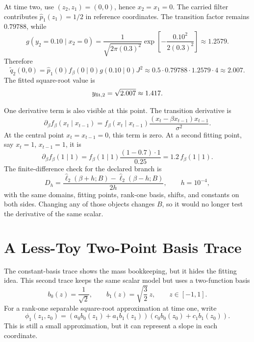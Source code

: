 \documentclass[11pt]{article}
\numberwithin{equation}{section}
\begin{document}
At time two, use \((z_2,z_1)=(0,0)\), hence \(x_2=x_1=0\).  The carried
filter contributes \(\widehat p_1(z_1)=1/2\) in reference coordinates.  The
transition factor remains \(0.79788\), while
\begin{equation}
    g(y_2=0.10\mid x_2=0)
    =
    \frac{1}{\sqrt{2\pi(0.3)^2}}
    \exp\!\left[-\frac{0.10^2}{2(0.3)^2}\right]
    \approx1.2579.
    \label{eq:p24-trace-density3}
\end{equation}
Therefore
\begin{equation}
    \widetilde q_2(0,0)
    =
    \widehat p_1(0)f_\beta(0\mid0)g(0.10\mid0)J^2
    \approx
    0.5\cdot0.79788\cdot1.2579\cdot4
    \approx2.007.
    \label{eq:p24-trace-q2}
\end{equation}
The fitted square-root value is
\begin{equation}
    y_{\rm fit,2}=\sqrt{2.007}\approx1.417.
    \label{eq:p24-trace-root2}
\end{equation}

One derivative term is also visible at this point.  The transition derivative
is
\begin{equation}
    \partial_\beta f_\beta(x_t\mid x_{t-1})
    =
    f_\beta(x_t\mid x_{t-1})
    \frac{(x_t-\beta x_{t-1})x_{t-1}}{\sigma^2}.
    \label{eq:p24-trace-df}
\end{equation}
At the central point \(x_t=x_{t-1}=0\), this term is zero.  At a second
fitting point, say \(x_t=1\), \(x_{t-1}=1\), it is
\begin{equation}
    \partial_\beta f_\beta(1\mid1)
    =
    f_\beta(1\mid1)
    \frac{(1-0.7)\cdot1}{0.25}
    =
    1.2\,f_\beta(1\mid1).
    \label{eq:p24-trace-df2}
\end{equation}
The finite-difference check for the declared branch is
\begin{equation}
    D_h
    =
    \frac{\widehat\ell_2(\beta+h;B)-\widehat\ell_2(\beta-h;B)}
         {2h},
    \qquad h=10^{-4},
    \label{eq:p24-trace-fd}
\end{equation}
with the same domains, fitting points, rank-one basis, shifts, and constants
on both sides.  Changing any of those objects changes \(B\), so it would no
longer test the derivative of the same scalar.

\section{A Less-Toy Two-Point Basis Trace}

The constant-basis trace shows the mass bookkeeping, but it hides the fitting
idea.  This second trace keeps the same scalar model but uses a two-function
basis
\begin{equation}
    b_0(z)=\frac{1}{\sqrt2},
    \qquad
    b_1(z)=\sqrt{\frac32}\,z,
    \qquad z\in[-1,1].
    \label{eq:p25-trace2-1}
\end{equation}
For a rank-one separable square-root approximation at time one, write
\begin{equation}
    \phi_1(z_1,z_0)
    =
    \left(a_0b_0(z_1)+a_1b_1(z_1)\right)
    \left(c_0b_0(z_0)+c_1b_1(z_0)\right).
    \label{eq:p25-trace2-2}
\end{equation}
This is still a small approximation, but it can represent a slope in each
coordinate.
\end{document}
